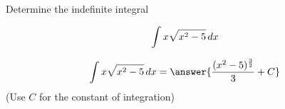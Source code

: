 \documentclass{ximera}
\author{Jason Miller}
\begin{document}
\begin{exercise}
Determine the indefinite integral 

\[
\int x\sqrt{x^{2}-5} \mathop{}\!d x
\]


\[
\int x \sqrt{x^{2}-5} \d x= \answer{ \frac{ (x^{2}-5)^{\frac{3}{2}}}{3} +C }
\]
(Use $C$ for the constant of integration)

\end{exercise}
\end{document}
